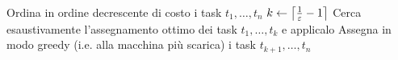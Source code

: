 
Ordina in ordine decrescente di costo i task $t_1,\dots,t_n$\;
$k \leftarrow \left\lceil \frac{1}{\varepsilon}-1 \right\rceil$\;
Cerca esaustivamente l'assegnamento ottimo dei task $t_1,\dots,t_k$ e applicalo\;
Assegna in modo greedy (i.e. alla macchina più scarica) i task $t_{k+1},\dots,t_n$\;
